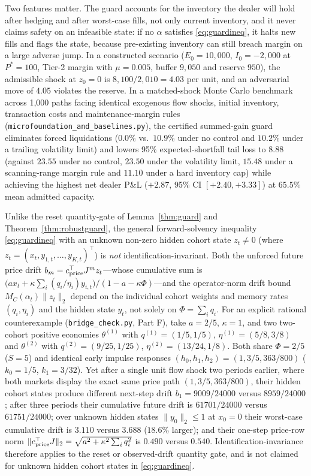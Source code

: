 Two features matter. The guard accounts for the inventory the dealer will hold after hedging and after worst-case fills, not only current inventory, and it never claims safety on an infeasible state: if no $\alpha$ satisfies \eqref{eq:guardineq}, it halts new fills and flags the state, because pre-existing inventory can still breach margin on a large adverse jump. In a constructed scenario ($E_0=10{,}000$, $I_0=-2{,}000$ at $P^*=100$, Tier-2 margin with $\mu=0.005$, buffer $9{,}050$ and reserve $950$), the admissible shock at $z_0=0$ is $8{,}100/2{,}010=4.03$ per unit, and an adversarial move of $4.05$ violates the reserve. In a matched-shock Monte Carlo benchmark across 1{,}000 paths facing identical exogenous flow shocks, initial inventory, transaction costs and maintenance-margin rules (\texttt{microfoundation\_and\_baselines.py}), the certified summed-gain guard eliminates forced liquidations ($0.0\%$ vs.\ $10.9\%$ under no control and $10.2\%$ under a trailing volatility limit) and lowers 95\% expected-shortfall tail loss to $8.88$ (against $23.55$ under no control, $23.50$ under the volatility limit, $15.48$ under a scanning-range margin rule and $11.10$ under a hard inventory cap) while achieving the highest net dealer P\&L ($+2.87$, 95\% CI $[+2.40,+3.33]$) at $65.5\%$ mean admitted capacity.

Unlike the reset quantity-gate of Lemma~\ref{thm:guard} and Theorem~\ref{thm:robustguard}, the general forward-solvency inequality \eqref{eq:guardineq} with an unknown non-zero hidden cohort state $z_t\neq 0$ (where $z_t=(x_t,y_{1,t},\ldots,y_{K,t})^\top$) is \emph{not} identification-invariant. Both the unforced future price drift $b_m=c_{\rm price}^\top J^m z_t$---whose cumulative sum is $\bigl(a x_t+\kappa\sum_i(q_i/\eta_i)y_{i,t}\bigr)/(1-a-\kappa\Phi)$---and the operator-norm drift bound $M_C(\alpha_t)\|z_t\|_2$ depend on the individual cohort weights and memory rates $(q_i,\eta_i)$ and the hidden state $y_t$, not solely on $\Phi=\sum_i q_i$. For an explicit rational counterexample (\texttt{bridge\_check.py}, Part F), take $a=2/5$, $\kappa=1$, and two two-cohort positive economies $\theta^{(1)}$ with $q^{(1)}=(1/5,1/5)$, $\eta^{(1)}=(5/8,3/8)$ and $\theta^{(2)}$ with $q^{(2)}=(9/25,1/25)$, $\eta^{(2)}=(13/24,1/8)$. Both share $\Phi=2/5$ ($S=5$) and identical early impulse responses $(h_0,h_1,h_2)=(1,3/5,363/800)$ ($k_0=1/5$, $k_1=3/32$). Yet after a single unit flow shock two periods earlier, where both markets display the exact same price path $(1,3/5,363/800)$, their hidden cohort states produce different next-step drift $b_1=9009/24000$ versus $8959/24000$; after three periods their cumulative future drift is $61701/24000$ versus $61751/24000$; over unknown hidden states $\|y_0\|_2\le 1$ at $x_0=0$ their worst-case cumulative drift is $3.110$ versus $3.688$ ($18.6\%$ larger); and their one-step price-row norm $\|c_{\rm price}^\top J\|_2=\sqrt{a^2+\kappa^2\sum_i q_i^2}$ is $0.490$ versus $0.540$. Identification-invariance therefore applies to the reset or observed-drift quantity gate, and is not claimed for unknown hidden cohort states in \eqref{eq:guardineq}.

